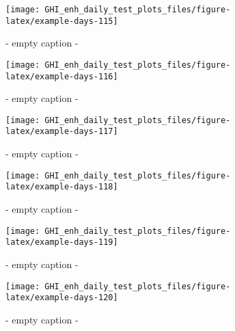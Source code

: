 \documentclass[
  10pt,
  a4paper,oneside]{article}
\begin{document}
\begin{figure}[H]

{\centering \texttt{[image: GHI\_enh\_daily\_test\_plots\_files/figure-latex/example-days-115]} 

}

\caption{ - empty caption - }\label{fig:example-days-115}
\end{figure}

\begin{figure}[H]

{\centering \texttt{[image: GHI\_enh\_daily\_test\_plots\_files/figure-latex/example-days-116]} 

}

\caption{ - empty caption - }\label{fig:example-days-116}
\end{figure}

\begin{figure}[H]

{\centering \texttt{[image: GHI\_enh\_daily\_test\_plots\_files/figure-latex/example-days-117]} 

}

\caption{ - empty caption - }\label{fig:example-days-117}
\end{figure}

\begin{figure}[H]

{\centering \texttt{[image: GHI\_enh\_daily\_test\_plots\_files/figure-latex/example-days-118]} 

}

\caption{ - empty caption - }\label{fig:example-days-118}
\end{figure}

\begin{figure}[H]

{\centering \texttt{[image: GHI\_enh\_daily\_test\_plots\_files/figure-latex/example-days-119]} 

}

\caption{ - empty caption - }\label{fig:example-days-119}
\end{figure}

\begin{figure}[H]

{\centering \texttt{[image: GHI\_enh\_daily\_test\_plots\_files/figure-latex/example-days-120]} 

}

\caption{ - empty caption - }\label{fig:example-days-120}
\end{figure}
\end{document}
